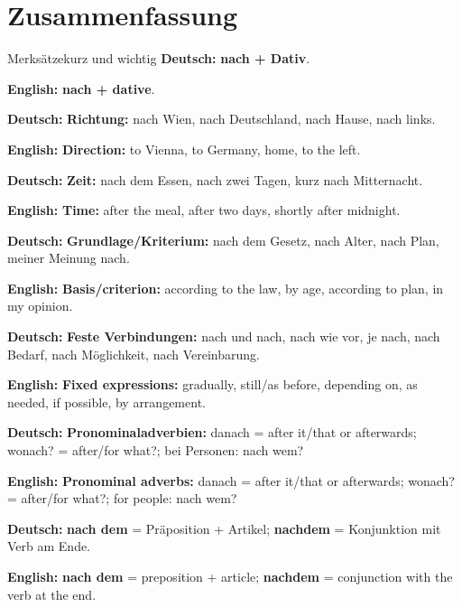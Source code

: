 \documentclass[a4paper,11pt]{article}
\newcommand{\GermanText}[1]{\textbf{Deutsch: }#1\par}
\newcommand{\EnglishText}[1]{{\small\color{SoftGray}\textbf{English: }#1\par}}
\begin{document}
    \section{Zusammenfassung}

        \begin{grammarentry}{Merksätze}{kurz und wichtig}
            \GermanText{\textbf{nach + Dativ}.}
            \EnglishText{\textbf{nach + dative}.}

            \GermanText{\textbf{Richtung:} nach Wien, nach Deutschland, nach Hause, nach links.}
            \EnglishText{\textbf{Direction:} to Vienna, to Germany, home, to the left.}

            \GermanText{\textbf{Zeit:} nach dem Essen, nach zwei Tagen, kurz nach Mitternacht.}
            \EnglishText{\textbf{Time:} after the meal, after two days, shortly after midnight.}

            \GermanText{\textbf{Grundlage/Kriterium:} nach dem Gesetz, nach Alter, nach Plan, meiner Meinung nach.}
            \EnglishText{\textbf{Basis/criterion:} according to the law, by age, according to plan, in my opinion.}

            \GermanText{\textbf{Feste Verbindungen:} nach und nach, nach wie vor, je nach, nach Bedarf, nach Möglichkeit, nach Vereinbarung.}
            \EnglishText{\textbf{Fixed expressions:} gradually, still/as before, depending on, as needed, if possible, by arrangement.}

            \GermanText{\textbf{Pronominaladverbien:} danach = after it/that or afterwards; wonach? = after/for what?; bei Personen: nach wem?}
            \EnglishText{\textbf{Pronominal adverbs:} danach = after it/that or afterwards; wonach? = after/for what?; for people: nach wem?}

            \GermanText{\textbf{nach dem} = Präposition + Artikel; \textbf{nachdem} = Konjunktion mit Verb am Ende.}
            \EnglishText{\textbf{nach dem} = preposition + article; \textbf{nachdem} = conjunction with the verb at the end.}
        \end{grammarentry}
\end{document}
